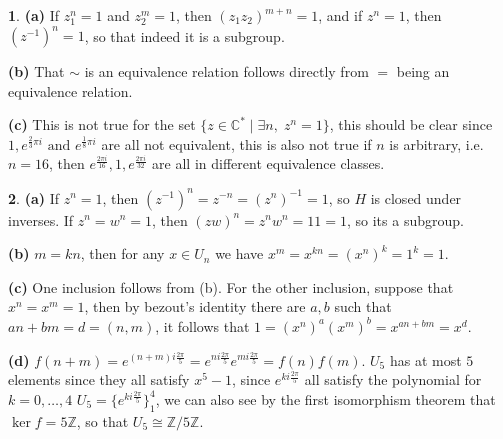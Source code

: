 \documentclass[10.5pt]{article}
\theoremstyle{definition}
\newtheorem{pb}{}
\newcommand{\set}[1]{\{#1\}}
\newcommand{\tand}{\text{ and }}
\begin{document}
    \begin{pb}
        \textbf{(a)} If \(z_1^n = 1\) and \(z_2^m = 1\), then \((z_1z_2)^{m+n} = 1\), and if \(z^n = 1\), then \((z^{-1})^n = 1\), so that indeed it is a subgroup.

        \textbf{(b)} That \(\sim\) is an equivalence relation follows directly from \(=\) being an equivalence relation.

        \textbf{(c)} This is not true for the set \(\set{z \in \mathbb{C}^* \mid \exists n, \;z^n = 1}\), this should be clear since \(1, e^{\frac23 \pi i} \tand e^{\frac18 \pi i}\) are all not equivalent, this is also not true if \(n\) is arbitrary, i.e. \(n=16\), then \(e^{\frac{2\pi i}{16}},1,e^{\frac{2\pi i}{32}}\) are all in different equivalence classes.
    \end{pb}
    \begin{pb}
        \textbf{(a)} If \(z^n = 1\), then \((z^{-1})^n = z^{-n} = (z^n)^{-1} = 1\), so \(H\) is closed under inverses. If \(z^n = w^n = 1\), then \((zw)^n = z^n w^n = 11 = 1\), so its a subgroup.

        \textbf{(b)} \(m = kn\), then for any \(x \in U_n\) we have \(x^m = x^{kn} = (x^n)^k = 1^k = 1\).

        \textbf{(c)} One inclusion follows from (b). For the other inclusion, suppose that \(x^n = x^m = 1\), then by bezout's identity there are \(a,b\) such that \(an + bm = d = (n,m)\), it follows that \(1 = (x^{n})^a(x^m)^b = x^{an + bm} = x^d\).

        \textbf{(d)} \(f(n+m) = e^{(n + m) i\frac{2\pi}{5}} = e^{n i\frac{2\pi}{5}}e^{m i\frac{2\pi}{5}} = f(n)f(m)\). \(U_5\) has at most \(5\) elements since they all satisfy \(x^5 - 1\), since \(e^{ki\frac{2\pi}{5}}\) all satisfy the polynomial for \(k=0,\hdots,4\) \(U_5 = \set{e^{ki\frac{2\pi}{5}}}_1^4\), we can also see by the first isomorphism theorem that \(\ker f = 5 \mathbb{Z}\), so that \(U_5 \cong \mathbb{Z}/5 \mathbb{Z}\).
    \end{pb}
\end{document}
